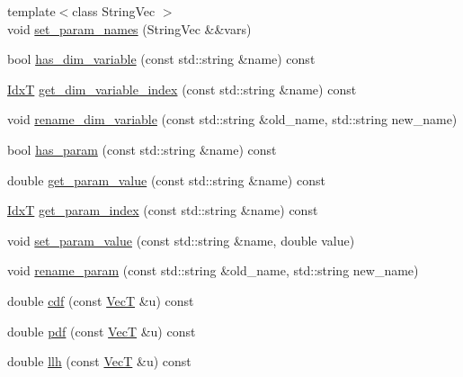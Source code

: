 \begin{DoxyCompactItemize}
{\footnotesize template$<$class String\+Vec $>$ }\\void \hyperlink{classprior__hessian_1_1CompositeDist_a38c4fdacf927824117d202422b04013c}{set\+\_\+param\+\_\+names} (String\+Vec \&\&vars)
\item 
bool \hyperlink{classprior__hessian_1_1CompositeDist_a0703fef1b4c1c1a20629a4d6fd12b8a4}{has\+\_\+dim\+\_\+variable} (const std\+::string \&name) const 
\item 
\hyperlink{namespaceprior__hessian_aa8d589f74e88bfa3b5750118acd1ab78}{IdxT} \hyperlink{classprior__hessian_1_1CompositeDist_aff137c4d5297d3e5f2d271b863d0b1f4}{get\+\_\+dim\+\_\+variable\+\_\+index} (const std\+::string \&name) const 
\item 
void \hyperlink{classprior__hessian_1_1CompositeDist_ab6aeadd029eacc9f9e35d6fbba746098}{rename\+\_\+dim\+\_\+variable} (const std\+::string \&old\+\_\+name, std\+::string new\+\_\+name)
\item 
bool \hyperlink{classprior__hessian_1_1CompositeDist_a6216610bfbcc92a40c7fa43ae60bd5af}{has\+\_\+param} (const std\+::string \&name) const 
\item 
double \hyperlink{classprior__hessian_1_1CompositeDist_a25183fbeb28704eca9f7fe31dccb7640}{get\+\_\+param\+\_\+value} (const std\+::string \&name) const 
\item 
\hyperlink{namespaceprior__hessian_aa8d589f74e88bfa3b5750118acd1ab78}{IdxT} \hyperlink{classprior__hessian_1_1CompositeDist_ad58e2371835b9a338b23e151485639fd}{get\+\_\+param\+\_\+index} (const std\+::string \&name) const 
\item 
void \hyperlink{classprior__hessian_1_1CompositeDist_a2b9cc7f1661dbd1bbd6f37c462781d5f}{set\+\_\+param\+\_\+value} (const std\+::string \&name, double value)
\item 
void \hyperlink{classprior__hessian_1_1CompositeDist_ace0aaa3698d76aba6a47f9061ff98902}{rename\+\_\+param} (const std\+::string \&old\+\_\+name, std\+::string new\+\_\+name)
\item 
double \hyperlink{classprior__hessian_1_1CompositeDist_a7e3a117e6140580cb93e359a92506678}{cdf} (const \hyperlink{namespaceprior__hessian_a0b42fc70dec525d83fb2ac155d9ab974}{VecT} \&u) const 
\item 
double \hyperlink{classprior__hessian_1_1CompositeDist_abbde55c133989f566801967484ccb2b8}{pdf} (const \hyperlink{namespaceprior__hessian_a0b42fc70dec525d83fb2ac155d9ab974}{VecT} \&u) const 
\item 
double \hyperlink{classprior__hessian_1_1CompositeDist_ad1192b84b64c7f43fc5623bb1a121833}{llh} (const \hyperlink{namespaceprior__hessian_a0b42fc70dec525d83fb2ac155d9ab974}{VecT} \&u) const 

\end{DoxyCompactItemize}
